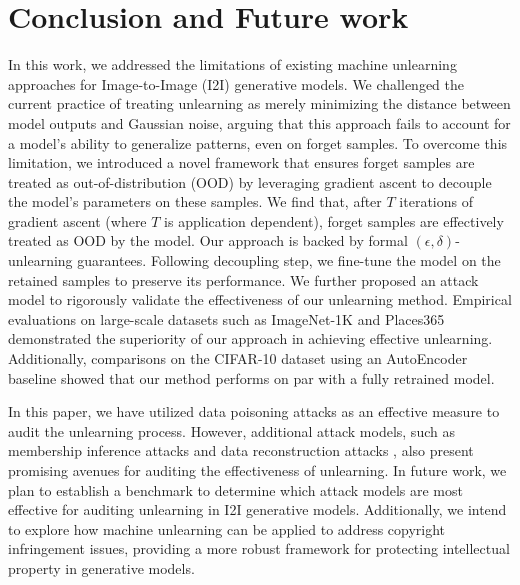 \section{Conclusion and Future work}

In this work, we addressed the limitations of existing machine unlearning approaches for Image-to-Image (I2I) generative models. We challenged the current practice of treating unlearning as merely minimizing the distance between model outputs and Gaussian noise, arguing that this approach fails to account for a model’s ability to generalize patterns, even on forget samples. To overcome this limitation, we introduced a novel framework that ensures forget samples are treated as out-of-distribution (OOD) by leveraging gradient ascent to decouple the model’s parameters on these samples. We find that, after $T$ iterations of gradient ascent (where $T$ is application dependent), forget samples are effectively treated as OOD by the model. Our approach is backed by formal $(\epsilon, \delta)$-unlearning guarantees. Following decoupling step, we fine-tune the model on the retained samples to preserve its performance. We further proposed an attack model to rigorously validate the effectiveness of our unlearning method. Empirical evaluations on large-scale datasets such as ImageNet-1K and Places365 demonstrated the superiority of our approach in achieving effective unlearning. Additionally, comparisons on the CIFAR-10 dataset using an AutoEncoder baseline showed that our method performs on par with a fully retrained model.

In this paper, we have utilized data poisoning attacks as an effective measure to audit the unlearning process. However, additional attack models, such as membership inference attacks \cite{duan2023diffusion} and data reconstruction attacks \cite{li2024gan}, also present promising avenues for auditing the effectiveness of unlearning. In future work, we plan to establish a benchmark to determine which attack models are most effective for auditing unlearning in I2I generative models. Additionally, we intend to explore how machine unlearning can be applied to address copyright infringement issues, providing a more robust framework for protecting intellectual property in generative models.